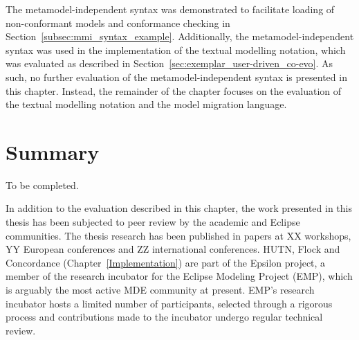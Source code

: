 The metamodel-independent syntax was demonstrated to facilitate loading of non-conformant models and conformance checking in Section~\ref{subsec:mmi_syntax_example}. Additionally, the metamodel-independent syntax was used in the implementation of the textual modelling notation, which was evaluated as described in Section~\ref{sec:exemplar_user-driven_co-evo}. As such, no further evaluation of the metamodel-independent syntax is presented in this chapter. Instead, the remainder of the chapter focuses on the evaluation of the textual modelling notation and the model migration language.








\section{Summary}
To be completed.

In addition to the evaluation described in this chapter, the work presented in this thesis has been subjected to peer review by the academic and Eclipse communities. The thesis research has been published in papers at XX workshops, YY European conferences and ZZ international conferences. HUTN, Flock and Concordance (Chapter~\ref{Implementation}) are part of the Epsilon project, a member of the research incubator for the Eclipse Modeling Project (EMP), which is arguably the most active MDE community at present. EMP's research incubator hosts a limited number of participants, selected through a rigorous process and contributions made to the incubator undergo regular technical review.